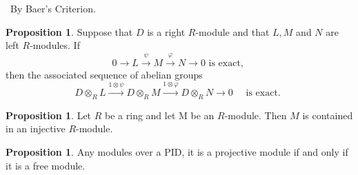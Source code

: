 \documentclass[a4paper,12pt]{article}
\newenvironment{prooff}{{\noindent\it\textcolor{cyan!40!black}{Proof}:}\,}{\par}
\theoremstyle{definition}
\newtheorem{prop}[defn]{Proposition}
\begin{document}
\begin{prooff}
    By Baer's Criterion.
\end{prooff}
\begin{prop}
    Suppose that $D$ is a right $R$-module and that $L, M$ and $N$ are left $R$-modules. If
    $$
        0 \longrightarrow L \stackrel{\psi}{\longrightarrow} M \stackrel{\varphi}{\longrightarrow} N \longrightarrow 0 \text { is exact, }
    $$
    then the associated sequence of abelian groups
    $$
        D \otimes_R L \stackrel{1 \otimes \psi}{\longrightarrow} D \otimes_R M \stackrel{1 \otimes \varphi}{\longrightarrow} D \otimes_R N \longrightarrow 0 \quad \text { is exact. }
    $$
\end{prop}
\begin{prop}
    Let $R$ be a ring and let M be an $R$-module. Then $M$ is contained
    in an injective $R$-module.
\end{prop}
\begin{prop}
    Any modules over a PID, it is a projective module if and only if it is a free module.
    \label{proposition:projective equivalent to free over PID}
\end{prop}
\end{document}
